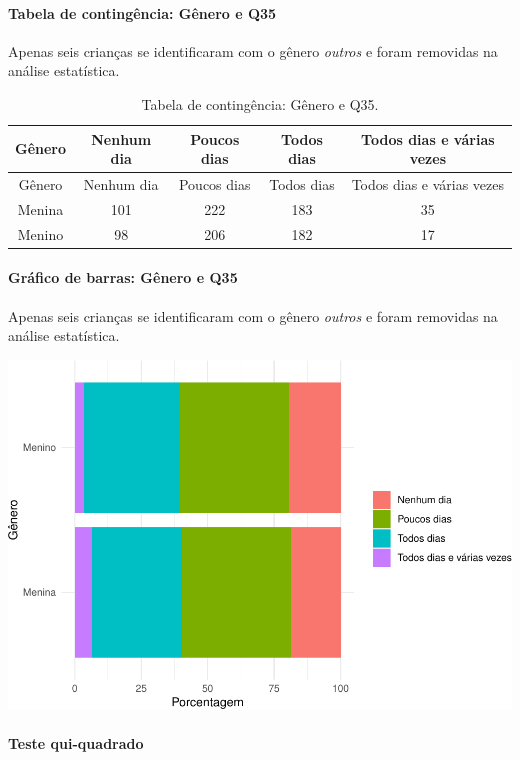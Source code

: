 \documentclass[]{article}
\let\oldparagraph\paragraph
\renewcommand{\paragraph}[1]{\oldparagraph{#1}\mbox{}}
\begin{document}
\cleardoublepage

\hypertarget{tabela-de-continguxeancia-guxeanero-e-q35}{%
\paragraph{Tabela de contingência: Gênero e Q35}\label{tabela-de-continguxeancia-guxeanero-e-q35}}

Apenas seis crianças se identificaram com o gênero \emph{outros} e foram removidas na análise estatística.

\begin{longtable}[]{@{}ccccc@{}}
\caption{\label{tab:unnamed-chunk-1261}Tabela de contingência: Gênero e Q35.}\tabularnewline
\toprule
Gênero & Nenhum dia & Poucos dias & Todos dias & Todos dias e várias vezes\tabularnewline
\midrule
\endfirsthead
\toprule
Gênero & Nenhum dia & Poucos dias & Todos dias & Todos dias e várias vezes\tabularnewline
\midrule
\endhead
Menina & 101 & 222 & 183 & 35\tabularnewline
Menino & 98 & 206 & 182 & 17\tabularnewline
\bottomrule
\end{longtable}

\hypertarget{gruxe1fico-de-barras-guxeanero-e-q35}{%
\paragraph{Gráfico de barras: Gênero e Q35}\label{gruxe1fico-de-barras-guxeanero-e-q35}}

Apenas seis crianças se identificaram com o gênero \emph{outros} e foram removidas na análise estatística.

\begin{center}\includegraphics[width=0.75\linewidth]{relatorio_covid19_files/figure-latex/unnamed-chunk-1262-1} \end{center}

\hypertarget{teste-qui-quadrado-108}{%
\paragraph{Teste qui-quadrado}\label{teste-qui-quadrado-108}}
\end{document}

